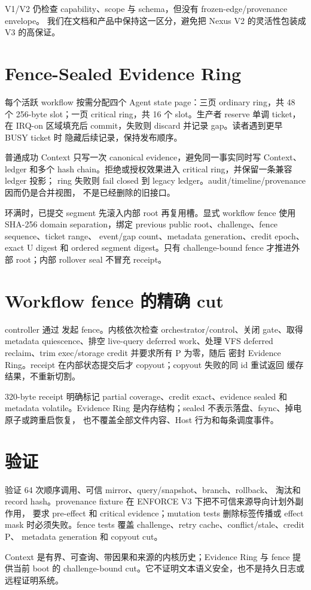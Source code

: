 V1/V2 仍检查 capability、scope 与 schema，但没有 frozen-edge/provenance envelope。
我们在文档和产品中保持这一区分，避免把 Nexus V2 的灵活性包装成 V3 的高保证。

\section{Fence-Sealed Evidence Ring}

每个活跃 workflow 按需分配四个 Agent state page：三页 ordinary ring，共 48 个
256-byte slot；一页 critical ring，共 16 个 slot。生产者 reserve 单调 ticket，在
IRQ-on 区域填充后 commit，失败则 discard 并记录 gap。读者遇到更早 BUSY ticket 时
隐藏后续记录，保持发布顺序。

普通成功 Context 只写一次 canonical evidence，避免同一事实同时写 Context、ledger
和多个 hash chain。拒绝或授权效果进入 critical ring，并保留一条兼容 ledger 投影；
ring 失败则 fail closed 到 legacy ledger。audit/timeline/provenance 因而仍是合并视图，
不是已经删除的旧接口。

环满时，已提交 segment 先滚入内部 root 再复用槽。显式 workflow fence 使用 SHA-256
domain separation，绑定 previous public root、challenge、fence sequence、ticket range、
event/gap count、metadata generation、credit epoch、exact U digest 和 ordered segment
digest。只有 challenge-bound fence 才推进外部 root；内部 rollover seal 不冒充 receipt。

\section{Workflow fence 的精确 cut}

controller 通过  发起 fence。内核依次检查
orchestrator/control、关闭 gate、取得 metadata quiescence、排空 live-query deferred
work、处理 VFS deferred reclaim、trim exec/storage credit 并要求所有 P 为零，随后
密封 Evidence Ring。receipt 在内部状态提交后才 copyout；copyout 失败的同 id 重试返回
缓存结果，不重新切割。

320-byte receipt 明确标记 partial coverage、credit exact、evidence sealed 和 metadata
volatile。Evidence Ring 是内存结构；sealed 不表示落盘、fsync、掉电原子或跨重启恢复，
也不覆盖全部文件内容、Host 行为和每条调度事件。

\section{验证}

 验证 64 次顺序调用、可信 mirror、query/snapshot、branch、rollback、
淘汰和 record hash。provenance fixture 在 ENFORCE V3 下把不可信来源导向计划外副作用，
要求 pre-effect  和 critical evidence；mutation tests 删除标签传播或 effect
mask 时必须失败。fence tests 覆盖 challenge、retry cache、conflict/stale、credit P、
metadata generation 和 copyout cut。

\begin{evidencebox}[任务三结论]
Context 是有界、可查询、带因果和来源的内核历史；Evidence Ring 与 fence 提供当前 boot
的 challenge-bound cut。它不证明文本语义安全，也不是持久日志或远程证明系统。
\end{evidencebox}
